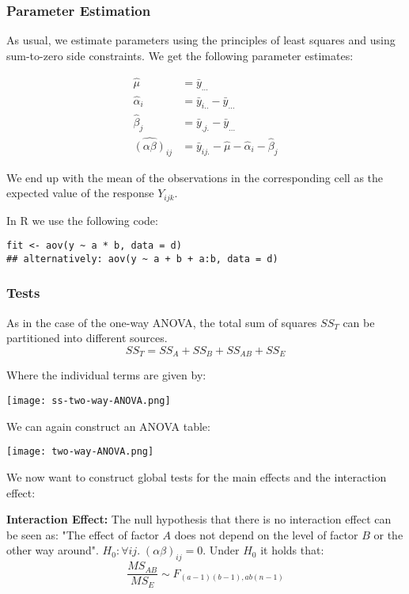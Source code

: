 \subsubsection{Parameter Estimation}

As usual, we estimate parameters using the principles of least squares and using sum-to-zero side constraints. We get the following parameter estimates:

\begin{align*}
	\hat \mu &= \bar y_{...} \\
	\hat \alpha_i &= \bar y_{i..} - \bar y_{...} \\
	\hat \beta_j &= \bar y_{.j.} - \bar y_{...} \\
	\widehat {(\alpha \beta)}_{ij} &= \bar y_{ij.} - \hat \mu - \hat \alpha_i - \hat \beta_j
\end{align*}

We end up with the mean of the observations in the corresponding cell as the expected value of the response $Y_{ijk}$.\medskip

In R we use the following code:
\begin{lstlisting}
fit <- aov(y ~ a * b, data = d) 
## alternatively: aov(y ~ a + b + a:b, data = d)
\end{lstlisting}

\subsubsection{Tests}

As in the case of the one-way ANOVA, the total sum of squares $SS_T$ can be partitioned into different sources.
$$SS_T = SS_A + SS_B + SS_{AB} + SS_E$$

Where the individual terms are given by:
\begin{center}
	\texttt{[image: ss-two-way-ANOVA.png]}
\end{center}

We can again construct an ANOVA table:

\begin{center}
	\texttt{[image: two-way-ANOVA.png]}
\end{center}

We now want to construct global tests for the main effects and the interaction effect: \medskip

\textbf{Interaction Effect:} The null hypothesis that there is no interaction effect can be seen as: "The effect of factor $A$ does not depend on the level of factor $B$ or the other way around". $H_0: \forall ij. \; (\alpha \beta)_{ij} = 0$. Under $H_0$ it holds that:
$$\frac{MS_{AB}}{MS_E} \sim F_{(a-1)(b-1),ab(n-1)}$$

